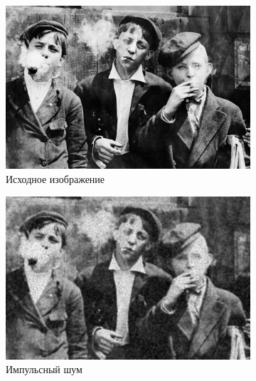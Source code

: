 \begin{figure}[ht] 
    \centering
    \begin{subfigure}[b]{0.5\linewidth}
        \centering
        \includegraphics[width=0.95\linewidth]{../lewis-hine-taschen-main-3.jpg} 
        \caption{Исходное изображение} 
        \label{wiener_7:a} 
        \vspace{4ex}
    \end{subfigure}%
    \begin{subfigure}[b]{0.5\linewidth}
      \centering
      \includegraphics[width=0.95\linewidth]{../Wiener_Filter/Wiener_Impulse_noise_(k=7).jpg} 
      \caption{Импульсный шум} 
      \label{weiner_7:b} 
      \vspace{4ex}
    \end{subfigure}
    \begin{subfigure}[b]{0.5\linewidth}
      \centering

\end{subfigure}
\end{figure}
